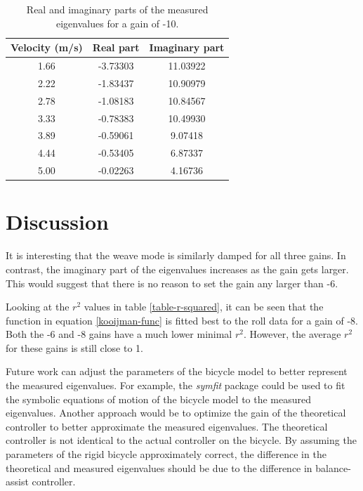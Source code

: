 \documentclass[12pt]{article}
\begin{document}
\begin{table}[]
    \centering
    \caption{Real and imaginary parts of the measured eigenvalues for a gain of -10.}
    \label{table-eigenvalues-gain-10}
    \begin{tabular}{c|c|c}
        \textbf{Velocity (m/s)} & \textbf{Real part} & \textbf{Imaginary part} \\ \hline
        1.66                    & -3.73303           & 11.03922                \\
        2.22                    & -1.83437           & 10.90979                \\
        2.78                    & -1.08183           & 10.84567                \\
        3.33                    & -0.78383           & 10.49930                \\
        3.89                    & -0.59061           & 9.07418                 \\
        4.44                    & -0.53405           & 6.87337                 \\
        5.00                    & -0.02263           & 4.16736
    \end{tabular}
\end{table}

\section{Discussion}
It is interesting that the weave mode is similarly damped for all three gains. In contrast, the
imaginary part of the eigenvalues increases as the gain gets larger. This would suggest that there
is no reason to set the gain any larger than -6.

Looking at the $r^2$ values in table \ref{table-r-squared}, it can be seen that the function in
equation \ref{kooijman-func} is fitted best to the roll data for a gain of -8. Both the -6 and -8
gains have a much lower minimal $r^2$. However, the average $r^2$ for these gains is still close to
1.

Future work can adjust the parameters of the bicycle model to better represent the measured
eigenvalues. For example, the \emph{symfit} package \cite{symfit} could be used to fit the symbolic
equations of motion of the bicycle model to the measured eigenvalues. Another approach would be to
optimize the gain of the theoretical controller to better approximate the measured eigenvalues. The
theoretical controller is not identical to the actual controller on the bicycle. By assuming the
parameters of the rigid bicycle approximately correct, the difference in the theoretical and
measured eigenvalues should be due to the difference in balance-assist controller.



\end{document}

